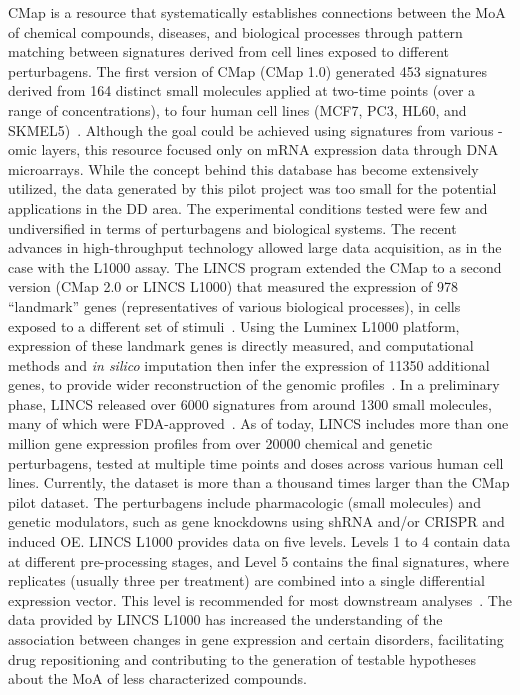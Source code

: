 \gls{CMap} is a resource that systematically establishes connections between the \gls{MoA} of chemical compounds, diseases, and biological processes through pattern matching between signatures derived from cell lines exposed to different perturbagens. The first version of CMap (CMap 1.0) generated 453 signatures derived from 164 distinct small molecules applied at two-time points (over a range of concentrations), to four human cell lines (MCF7, PC3, HL60, and SKMEL5)~\cite{RN34}.
Although the goal could be achieved using signatures from various -omic layers, this resource focused only on mRNA expression data through \gls{DNA} microarrays. While the concept behind this database has become extensively utilized, the data generated by this pilot project was too small for the potential applications in the \gls{DD} area. The experimental conditions tested were few and undiversified in terms of perturbagens and biological systems. 
The recent advances in high-throughput technology allowed large data acquisition, as in the case with the L1000 assay.
The \gls{LINCS} program extended the CMap to a second version (CMap 2.0 or LINCS L1000) that measured the expression of 978 “landmark” genes (representatives of various biological processes), in cells exposed to a different set of stimuli~\cite{RN30}. 
Using the Luminex L1000 platform, expression of these landmark genes is directly measured, and computational methods and \textit{in silico} imputation then infer the expression of 11350 additional genes, to provide wider reconstruction of the genomic profiles~\cite{RN122}. 
In a preliminary phase, LINCS released over 6000 signatures from around 1300 small molecules, many of which were FDA-approved~\cite{RN115}. 
As of today, LINCS includes more than one million gene expression profiles from over 20000 chemical and genetic perturbagens, tested at multiple time points and doses across various human cell lines. 
Currently, the dataset is more than a thousand times larger than the CMap pilot dataset. 
The perturbagens include pharmacologic (small molecules) and genetic modulators, such as gene knockdowns using \gls{shRNA} and/or CRISPR and induced \gls{OE}. 
LINCS L1000 provides data on five levels. 
Levels 1 to 4 contain data at different pre-processing stages, and Level 5 contains the final signatures, where replicates (usually three per treatment) are combined into a single differential expression vector. 
This level is recommended for most downstream analyses~\cite{RN30}. 
The data provided by LINCS L1000 has increased the understanding of the association between changes in gene expression and certain disorders, facilitating drug repositioning and contributing to the generation of testable hypotheses about the \gls{MoA} of less characterized compounds. 
